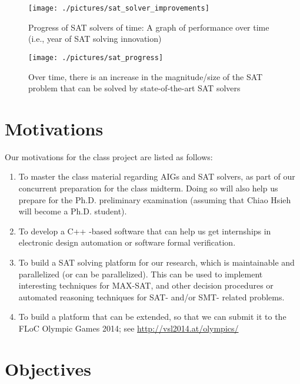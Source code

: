 \documentclass[letter,12pt]{article}
\begin{document}
\begin{figure}
\centering 
\texttt{[image: ./pictures/sat\_solver\_improvements]}
\caption{Progress of SAT solvers of time: A graph of performance over time (i.e., year of SAT solving innovation) \cite{Sabharwal2007,Sabharwal2011,Ganesh2013,Samulowitz2008}}
\label{fig:satsolvingprogress}
\end{figure}


\begin{figure}
\centering 
\texttt{[image: ./pictures/sat\_progress]}
\caption{Over time, there is an increase in the magnitude/size of the SAT problem that can be solved by state-of-the-art SAT solvers }
\label{fig:satproblemprogress}
\end{figure}



\section{Motivations}
\label{sec:motivations}

Our motivations for the class project are listed as follows: \vspace{-0.3cm}
\begin{enumerate} \itemsep -4pt
\item To master the class material regarding AIGs and SAT solvers, as part of our concurrent preparation for the class midterm. Doing so will also help us prepare for the Ph.D. preliminary examination (assuming that Chiao Hsieh will become a Ph.D. student).
\item To develop a C++ -based software that can help us get internships in electronic design automation or software formal verification.
\item To build a SAT solving platform for our research, which is maintainable and parallelized (or can be parallelized). This can be used to implement interesting techniques for MAX-SAT, and other decision procedures or automated reasoning techniques for SAT- and/or SMT- related problems.
\item To build a platform that can be extended, so that we can submit it to the FLoC Olympic Games 2014; see \url{http://vsl2014.at/olympics/}
\end{enumerate}






\section{Objectives}
\label{sec:objectives}
\end{document}
